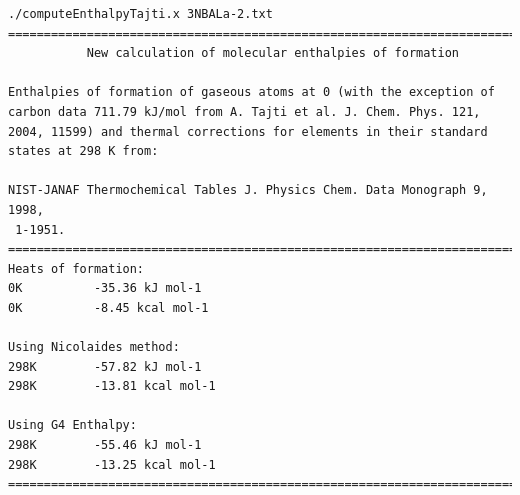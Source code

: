\newpage

\begin{lstlisting}[caption = Output de 3NBALa-2.txt en EnthalpyTajti]
./computeEnthalpyTajti.x 3NBALa-2.txt
========================================================================
           New calculation of molecular enthalpies of formation                         
                                                                                                   
Enthalpies of formation of gaseous atoms at 0 (with the exception of 
carbon data 711.79 kJ/mol from A. Tajti et al. J. Chem. Phys. 121, 
2004, 11599) and thermal corrections for elements in their standard 
states at 298 K from:                   
                                                                                                   
NIST-JANAF Thermochemical Tables J. Physics Chem. Data Monograph 9, 1998,
 1-1951.
========================================================================
Heats of formation: 
0K          -35.36 kJ mol-1
0K          -8.45 kcal mol-1
                                                                                                   
Using Nicolaides method: 
298K        -57.82 kJ mol-1
298K        -13.81 kcal mol-1
                                                                                                   
Using G4 Enthalpy: 
298K        -55.46 kJ mol-1
298K        -13.25 kcal mol-1
========================================================================
\end{lstlisting}

\newpage

